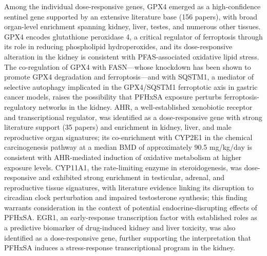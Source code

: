 Among the individual dose-responsive genes, GPX4 emerged as a high-confidence sentinel gene supported by an extensive literature base (156 papers), with broad organ-level enrichment spanning kidney, liver, testes, and numerous other tissues. GPX4 encodes glutathione peroxidase 4, a critical regulator of ferroptosis through its role in reducing phospholipid hydroperoxides, and its dose-responsive alteration in the kidney is consistent with PFAS-associated oxidative lipid stress. The co-regulation of GPX4 with FASN—whose knockdown has been shown to promote GPX4 degradation and ferroptosis—and with SQSTM1, a mediator of selective autophagy implicated in the GPX4/SQSTM1 ferroptotic axis in gastric cancer models, raises the possibility that PFHxSA exposure perturbs ferroptosis-regulatory networks in the kidney. AHR, a well-established xenobiotic receptor and transcriptional regulator, was identified as a dose-responsive gene with strong literature support (35 papers) and enrichment in kidney, liver, and male reproductive organ signatures; its co-enrichment with CYP2E1 in the chemical carcinogenesis pathway at a median BMD of approximately 90.5 mg/kg/day is consistent with AHR-mediated induction of oxidative metabolism at higher exposure levels. CYP11A1, the rate-limiting enzyme in steroidogenesis, was dose-responsive and exhibited strong enrichment in testicular, adrenal, and reproductive tissue signatures, with literature evidence linking its disruption to circadian clock perturbation and impaired testosterone synthesis; this finding warrants consideration in the context of potential endocrine-disrupting effects of PFHxSA. EGR1, an early-response transcription factor with established roles as a predictive biomarker of drug-induced kidney and liver toxicity, was also identified as a dose-responsive gene, further supporting the interpretation that PFHxSA induces a stress-response transcriptional program in the kidney.

